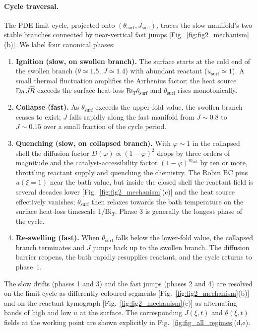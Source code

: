 \documentclass[aps,pre,reprint,superscriptaddress,longbibliography,floatfix]{revtex4-2}
\newcommand{\Da}{\mathrm{Da}}
\newcommand{\Bi}{\mathrm{Bi}}
\newcommand{\Rhat}{\widehat{R}}
\begin{document}
\paragraph{Cycle traversal.}  The PDE limit cycle, projected onto
$(\theta_\mathrm{surf}, J_\mathrm{surf})$, traces the slow manifold's
two stable branches connected by near-vertical fast jumps
[Fig.~\ref{fig:fig2_mechanism}(b)].
We label four canonical phases:
\begin{enumerate}
\item \textbf{Ignition (slow, on swollen branch).}  The surface
  starts at the cold end of the swollen branch
  ($\theta\!\simeq\!1.5$, $J\!\simeq\!1.4$) with abundant reactant
  ($u_\mathrm{surf}\!\simeq\!1$).  A small thermal fluctuation
  amplifies the Arrhenius factor; the heat source $\Da\,J\Rhat$
  exceeds the surface heat loss $\Bi_T\theta_\mathrm{surf}$ and
  $\theta_\mathrm{surf}$ rises monotonically.
\item \textbf{Collapse (fast).}  As $\theta_\mathrm{surf}$ exceeds
  the upper-fold value, the swollen branch ceases to exist; $J$
  falls rapidly along the fast manifold from $J\!\sim\!0.8$ to
  $J\!\sim\!0.15$ over a small fraction of the cycle period.
\item \textbf{Quenching (slow, on collapsed branch).}  With
  $\varphi\!\sim\!1$ in the collapsed shell the diffusion factor
  $D(\varphi)\propto(1-\varphi)^2$ drops by three orders of magnitude
  and the catalyst-accessibility factor $(1-\varphi)^{m_\mathrm{act}}$
  by ten or more, throttling reactant supply and quenching the
  chemistry. The Robin BC pins
  $u(\xi\!=\!1)$ near the bath value, but inside the closed shell
  the reactant field is several decades lower
  [Fig.~\ref{fig:fig2_mechanism}(c)] and the heat source effectively
  vanishes; $\theta_\mathrm{surf}$ then relaxes towards the bath
  temperature on the surface heat-loss timescale $1/\Bi_T$. Phase 3
  is generally the longest phase of the cycle.
\item \textbf{Re-swelling (fast).}  When $\theta_\mathrm{surf}$
  falls below the lower-fold value, the collapsed branch terminates
  and $J$ jumps back up to the swollen branch.  The diffusion
  barrier reopens, the bath rapidly resupplies reactant, and the
  cycle returns to phase~1.
\end{enumerate}
The slow drifts (phases 1 and 3) and the fast jumps (phases 2 and 4)
are resolved on the limit cycle as differently-coloured segments
[Fig.~\ref{fig:fig2_mechanism}(b)] and on the reactant kymograph
[Fig.~\ref{fig:fig2_mechanism}(c)] as alternating bands of high and
low $u$ at the surface. The corresponding $J(\xi,t)$ and
$\theta(\xi,t)$ fields at the working point are shown explicitly in
Fig.~\ref{fig:fig_all_regimes}(d,e).
\end{document}
